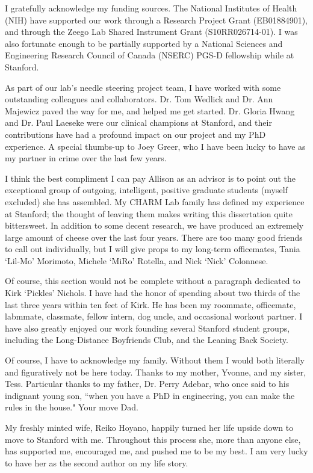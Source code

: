 \documentclass[12pt,twoside]{report}
\begin{document}
I gratefully acknowledge my funding sources. The National Institutes of Health (NIH) have supported our work through a Research Project Grant (EB01884901), and through the Zeego Lab Shared Instrument Grant (S10RR026714-01). I was also fortunate enough to be partially supported by a National Sciences and Engineering Research Council of Canada (NSERC) PGS-D fellowship while at Stanford.   

As part of our lab's needle steering project team, I have worked with some outstanding colleagues and collaborators. Dr. Tom Wedlick and Dr. Ann Majewicz paved the way for me, and helped me get started. Dr. Gloria Hwang and Dr. Paul Laeseke were our clinical champions at Stanford, and their  contributions have had a profound impact on our project and my PhD experience. A special thumbs-up to Joey Greer, who I have been lucky to have as my partner in crime over the last few years.

I think the best compliment I can pay Allison as an advisor is to point out the exceptional group of outgoing, intelligent, positive graduate students (myself excluded) she has assembled. My CHARM Lab family has defined my experience at Stanford; the thought of leaving them makes writing this dissertation quite bittersweet. In addition to some decent research, we have produced an extremely large amount of cheese over the last four years. There are too many good friends to call out individually, but I will give props to my long-term officemates, Tania `Lil-Mo' Morimoto, Michele `MiRo' Rotella, and Nick `Nick' Colonnese. 

Of course, this section would not be complete without a paragraph dedicated to Kirk `Pickles' Nichols. I have had the honor of spending about two thirds of the last three years within ten feet of Kirk. He has been my roommate, officemate, labmmate, classmate, fellow intern, dog uncle, and occasional workout partner. I have also greatly enjoyed our work founding several Stanford student groups, including the Long-Distance Boyfriends Club, and the Leaning Back Society.     

Of course, I have to acknowledge my family. Without them I would both literally and figuratively not be here today. Thanks to my mother, Yvonne, and my sister, Tess. Particular thanks to my father, Dr. Perry Adebar, who once said to his indignant young son, ``when you have a PhD in engineering, you can make the rules in the house." Your move Dad.

My freshly minted wife, Reiko Hoyano, happily turned her life upside down to move to Stanford with me. Throughout this process she, more than anyone else, has supported me, encouraged me, and pushed me to be my best. I am very lucky to have her as the second author on my life story.
\end{document}
